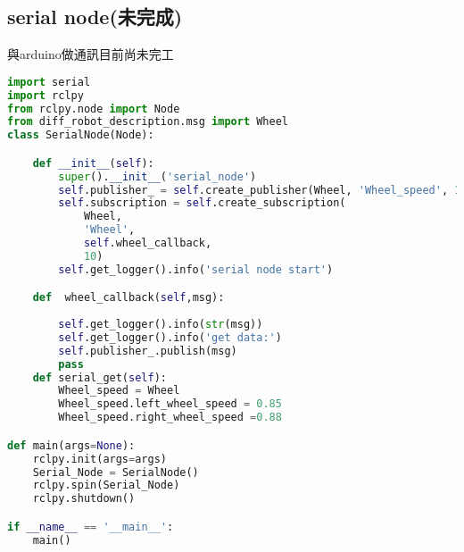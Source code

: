 \subsection{serial node(未完成)}
與arduino做通訊目前尚未完工
\begin{lstlisting}[language=Python, caption=control node]
import serial
import rclpy
from rclpy.node import Node
from diff_robot_description.msg import Wheel
class SerialNode(Node):

    def __init__(self):
        super().__init__('serial_node')
        self.publisher_ = self.create_publisher(Wheel, 'Wheel_speed', 10)
        self.subscription = self.create_subscription(
            Wheel,
            'Wheel',
            self.wheel_callback,
            10)
        self.get_logger().info('serial node start')

    def  wheel_callback(self,msg):
        
        self.get_logger().info(str(msg))
        self.get_logger().info('get data:')
        self.publisher_.publish(msg)
        pass
    def serial_get(self):
        Wheel_speed = Wheel
        Wheel_speed.left_wheel_speed = 0.85
        Wheel_speed.right_wheel_speed =0.88

def main(args=None):
    rclpy.init(args=args)
    Serial_Node = SerialNode()
    rclpy.spin(Serial_Node)
    rclpy.shutdown()

if __name__ == '__main__':
    main()
\end{lstlisting}

